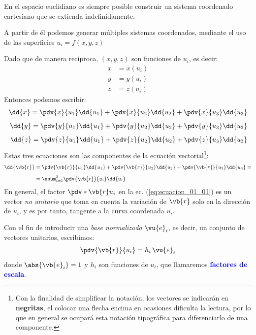 En el espacio euclidiano es siempre posible construir un sistema coordenado cartesiano que se extienda indefinidamente.
\par
A partir de él podemos generar múltiples sistemas coordenados, mediante el uso de las superficies $u_{i} = f (x, y, z)$
\par
Dado que de manera recíproca, $(x, y, z)$ son funciones de $u_{i}$, es decir:
\begin{align*}
x &= x (u_{i}) \\
y &= y (u_{i}) \\
z &= z (u_{i})
\end{align*}
Entonces podemos escribir:
\begin{align*}
\dd{x} = \pdv{x}{u_{1}} \dd{u_{1}} + \pdv{x}{u_{2}} \dd{u_{2}} + \pdv{x}{u_{3}} \dd{u_{3}} \\[0.5em]
\dd{y} = \pdv{y}{u_{1}} \dd{u_{1}} + \pdv{y}{u_{2}} \dd{u_{2}} + \pdv{y}{u_{3}} \dd{u_{3}} \\[0.5em]
\dd{z} = \pdv{z}{u_{1}} \dd{u_{1}} + \pdv{z}{u_{2}} \dd{u_{2}} + \pdv{z}{u_{3}} \dd{u_{3}}
\end{align*}
Estas tres ecuaciones son las componentes de la ecuación vectorial\footnote{Con la finalidad de simplificar la notación, los vectores se indicarán en \textbf{negritas}, el colocar una flecha encima en ocasiones dificulta la lectura, por lo que en general se ocupará esta notación tipográfica para diferenciarlo de una componente.}:
\begin{align}
\begin{aligned}
\dd{\vb{r}} &= \pdv{\vb{r}}{u_{1}} \dd{u_{1}} + \pdv{\vb{r}}{u_{2}} \dd{u_{2}} + \pdv{\vb{r}}{u_{3}} \dd{u_{3}} = \\[0.5em]
&= \nsum_{i=1}^{3} \pdv{\vb{r}}{u_{i}} \dd{u_{i}}
\end{aligned}
\label{eq:ecuacion_01_01}
\end{align}
En general, el factor $\pdv*{\vb{r}}{u_{i}}$ en la ec. (\ref{eq:ecuacion_01_01}) es un vector \emph{no unitario} que toma en cuenta la variación de $\vb{r}$ solo en la dirección de $u_{i}$, y es por tanto, tangente a la curva coordenada $u_{i}$.
\par
Con el fin de introducir una \emph{base normalizada} $\vu{e}_{i}$, es decir, un conjunto de vectores unitarios, escribimos:
\begin{align}
\pdv{\vb{r}}{u_{i}} = h_{i} \, \vu{e}_{i}
\label{eq:ecuacion_01_02}
\end{align}
donde $\abs{\vb{e}_{i}} = 1$ y $h_{i}$ son funciones de $u_{i}$, que llamaremos \textbf{\textcolor{blue}{factores de escala}}.

